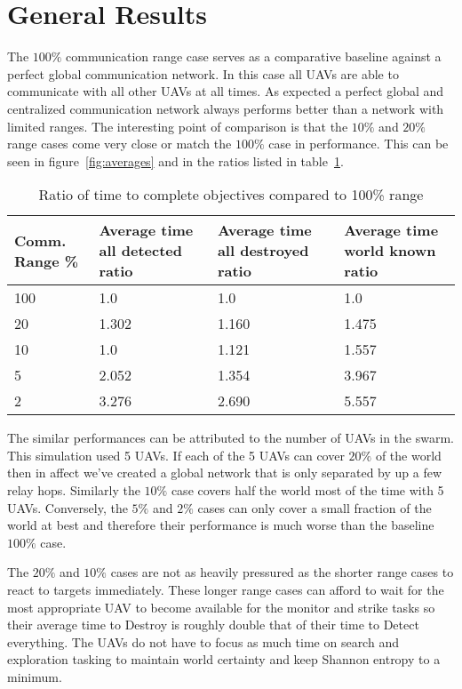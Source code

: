 \section{General Results}

The $100\%$ communication range case serves as a comparative baseline against a perfect global communication network.  In this case all UAVs are able to communicate with all other UAVs at all times.  As expected a perfect global and centralized communication network always performs better than a network with limited ranges.  The interesting point of comparison is that the $10\%$ and $20\%$ range cases come very close or match the $100\%$ case in performance.  This can be seen in figure~\ref{fig:averages} and in the ratios listed in table~\ref{tab:avgResultsRatio}.

\begin{table}[H]
	\caption{Ratio of time to complete objectives compared to 100\% range}
	\centering
	\label{tab:avgResultsRatio}
	\begin{tabular}{|p{1.25cm}|p{1.5cm}|p{1.75cm}|p{1.5cm}|}
		\hline
		Comm. Range \% & Average time all detected ratio & Average time all destroyed ratio & Average time world known ratio\\
		\hline
		100 & 1.0   & 1.0   & 1.0  \\ \hline
		20  & 1.302 & 1.160 & 1.475  \\ \hline
		10  & 1.0   & 1.121 & 1.557  \\ \hline
		5   & 2.052 & 1.354 & 3.967 \\ \hline
		2   & 3.276 & 2.690 & 5.557 \\ \hline
	\end{tabular}
\end{table}

The similar performances can be attributed to the number of UAVs in the swarm.  This simulation used 5 UAVs.  If each of the 5 UAVs can cover $20\%$ of the world then in affect we've created a global network that is only separated by up a few relay hops.  Similarly the $10\%$ case covers half the world most of the time with 5 UAVs.  Conversely, the $5\%$ and $2\%$ cases can only cover a small fraction of the world at best and therefore their performance is much worse than the baseline $100\%$ case.



The $20\%$ and $10\%$ cases are not as heavily pressured as the shorter range cases to react to targets immediately.  These longer range cases can afford to wait for the most appropriate UAV to become available for the monitor and strike tasks so their average time to Destroy is roughly double that of their time to Detect everything.  The UAVs do not have to focus as much time on search and exploration tasking to maintain world certainty and keep Shannon entropy to a minimum.

